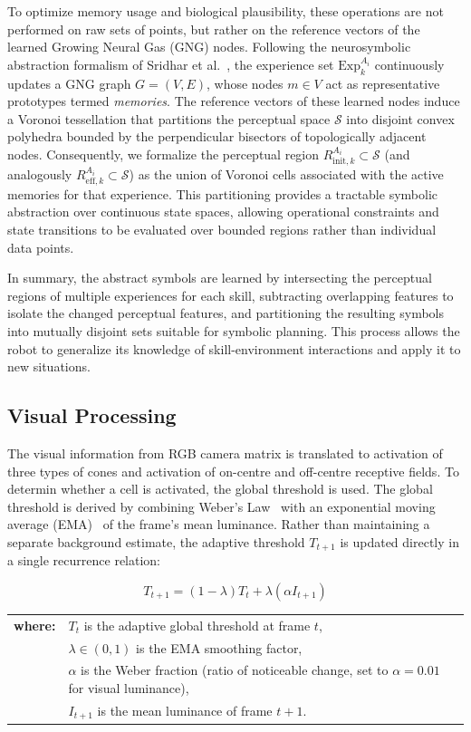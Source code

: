 To optimize memory usage and biological plausibility, these operations are not performed on raw sets of points, but rather on the reference vectors of the learned Growing Neural Gas (GNG) nodes. Following the neurosymbolic abstraction formalism of Sridhar et al.~\textcite{sridhar2023guaranteed}, the experience set $\mathrm{Exp}_{k}^{A_i}$ continuously updates a GNG graph $G = (V, E)$, whose nodes $m \in V$ act as representative prototypes termed \emph{memories}. The reference vectors of these learned nodes induce a Voronoi tessellation that partitions the perceptual space $\mathcal{S}$ into disjoint convex polyhedra bounded by the perpendicular bisectors of topologically adjacent nodes. Consequently, we formalize the perceptual region $R_{\mathrm{init}, k}^{A_i} \subset \mathcal{S}$ (and analogously $R_{\mathrm{eff}, k}^{A_i} \subset \mathcal{S}$) as the union of Voronoi cells associated with the active memories for that experience. This partitioning provides a tractable symbolic abstraction over continuous state spaces, allowing operational constraints and state transitions to be evaluated over bounded regions rather than individual data points.

In summary, the abstract symbols are learned by intersecting the perceptual regions of multiple experiences for each skill, subtracting overlapping features to isolate the changed perceptual features, and partitioning the resulting symbols into mutually disjoint sets suitable for symbolic planning. This process allows the robot to generalize its knowledge of skill-environment interactions and apply it to new situations.

\subsection{Visual Processing} \label{chapter:idea:visuals}
The visual information from RGB camera matrix is translated to activation of three types of cones and activation of on-centre and off-centre receptive fields. To determin whether a cell is activated, the global threshold is used. The global threshold is derived by combining Weber's Law~\parencite{weber1996eh} with an exponential moving average (EMA)~\parencite{wren1997pfinder} of the frame's mean luminance. Rather than maintaining a separate background estimate, the adaptive threshold $T_{t+1}$ is updated directly in a single recurrence relation:

\begin{equation} \label{eq:t_formula}
    T_{t+1} = (1 - \lambda) T_t + \lambda (\alpha I_{t+1})
\end{equation}
\noindent\small
\begin{tabularx}{\textwidth}{@{}l@{\hskip 6pt}X}
    \textbf{where:} & $T_t$ is the adaptive global threshold at frame $t$, \\
                    & $\lambda \in (0,1)$ is the EMA smoothing factor, \\
                    & $\alpha$ is the Weber fraction (ratio of noticeable change, set to $\alpha = 0.01$ for visual luminance), \\
                    & $I_{t+1}$ is the mean luminance of frame $t+1$.
\end{tabularx}
\normalsize

